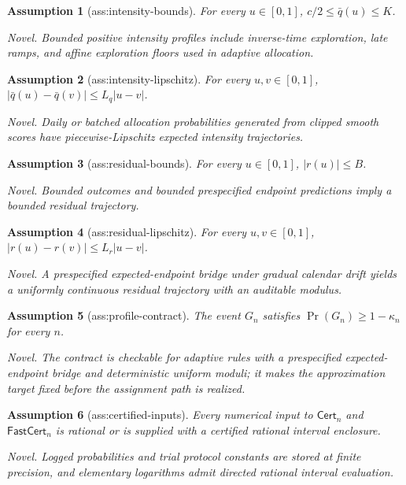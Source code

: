 \documentclass{article}
\newtheorem{assumption}{Assumption}
\begin{document}
\begin{assumption}[ass:intensity-bounds]\label{ass:intensity-bounds}
For every \(u\in[0,1]\), \(c/2\le\bar q(u)\le K\).
\par\smallskip\noindent\emph{Novel.} Bounded positive intensity profiles include inverse-time exploration, late ramps, and affine exploration floors used in adaptive allocation.
\end{assumption}

\begin{assumption}[ass:intensity-lipschitz]\label{ass:intensity-lipschitz}
For every \(u,v\in[0,1]\), \(|\bar q(u)-\bar q(v)|\le L_q|u-v|\).
\par\smallskip\noindent\emph{Novel.} Daily or batched allocation probabilities generated from clipped smooth scores have piecewise-Lipschitz expected intensity trajectories.
\end{assumption}

\begin{assumption}[ass:residual-bounds]\label{ass:residual-bounds}
For every \(u\in[0,1]\), \(|r(u)|\le B\).
\par\smallskip\noindent\emph{Novel.} Bounded outcomes and bounded prespecified endpoint predictions imply a bounded residual trajectory.
\end{assumption}

\begin{assumption}[ass:residual-lipschitz]\label{ass:residual-lipschitz}
For every \(u,v\in[0,1]\), \(|r(u)-r(v)|\le L_r|u-v|\).
\par\smallskip\noindent\emph{Novel.} A prespecified expected-endpoint bridge under gradual calendar drift yields a uniformly continuous residual trajectory with an auditable modulus.
\end{assumption}

\begin{assumption}[ass:profile-contract]\label{ass:profile-contract}
The event \(G_n\) satisfies \(\Pr(G_n)\ge1-\kappa_n\) for every \(n\).
\par\smallskip\noindent\emph{Novel.} The contract is checkable for adaptive rules with a prespecified expected-endpoint bridge and deterministic uniform moduli; it makes the approximation target fixed before the assignment path is realized.
\end{assumption}

\begin{assumption}[ass:certified-inputs]\label{ass:certified-inputs}
Every numerical input to \(\mathsf{Cert}_n\) and \(\mathsf{FastCert}_n\) is rational or is supplied with a certified rational interval enclosure.
\par\smallskip\noindent\emph{Novel.} Logged probabilities and trial protocol constants are stored at finite precision, and elementary logarithms admit directed rational interval evaluation.
\end{assumption}
\end{document}

